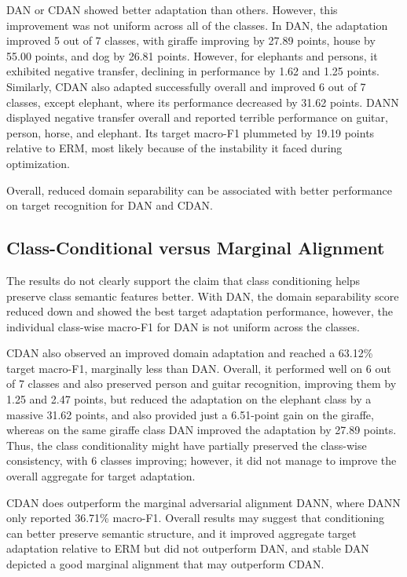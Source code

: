 DAN or CDAN showed better adaptation than others. However, this improvement was not uniform across all of the classes. In DAN, the adaptation improved 5 out of 7 classes, with giraffe improving by 27.89 points, house by 55.00 points, and dog by 26.81 points. However, for elephants and persons, it exhibited negative transfer, declining in performance by 1.62 and 1.25 points. Similarly, CDAN also adapted successfully overall and improved 6 out of 7 classes, except elephant, where its performance decreased by 31.62 points. DANN displayed negative transfer overall and reported terrible performance on guitar, person, horse, and elephant. Its target macro-F1 plummeted by 19.19 points relative to ERM, most likely because of the instability it faced during optimization.

Overall, reduced domain separability can be associated with better performance on target recognition for DAN and CDAN.

\subsection{Class-Conditional versus Marginal Alignment}

The results do not clearly support the claim that class conditioning helps preserve class semantic features better. With DAN, the domain separability score reduced down and showed the best target adaptation performance, however, the individual class-wise macro-F1 for DAN is not uniform across the classes.

CDAN also observed an improved domain adaptation and reached a 63.12\% target macro-F1, marginally less than DAN. Overall, it performed well on 6 out of 7 classes and also preserved person and guitar recognition, improving them by 1.25 and 2.47 points, but reduced the adaptation on the elephant class by a massive 31.62 points, and also provided just a 6.51-point gain on the giraffe, whereas on the same giraffe class DAN improved the adaptation by 27.89 points. Thus, the class conditionality might have partially preserved the class-wise consistency, with 6 classes improving; however, it did not manage to improve the overall aggregate for target adaptation.

CDAN does outperform the marginal adversarial alignment DANN, where DANN only reported 36.71\% macro-F1. Overall results may suggest that conditioning can better preserve semantic structure, and it improved aggregate target adaptation relative to ERM but did not outperform DAN, and stable DAN depicted a good marginal alignment that may outperform CDAN.

